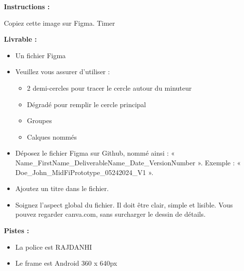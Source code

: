 \makeheaderfiles

\textbf{Instructions :}

Copiez cette image sur Figma.
Timer

\textbf{Livrable :}

\begin{itemize}
\item Un fichier Figma
\item Veuillez vous assurer d'utiliser :
\begin{itemize}
\item 2 demi-cercles pour tracer le cercle autour du minuteur
\item Dégradé pour remplir le cercle principal
\item Groupes
\item Calques nommés
\end{itemize}
\item Déposez le fichier Figma sur Github, nommé ainsi : « Name\_FirstName\_DeliverableName\_Date\_VersionNumber ». Exemple : « Doe\_John\_MidFiPrototype\_05242024\_V1 ».
\item Ajoutez un titre dans le fichier.
\item Soignez l'aspect global du fichier. Il doit être clair, simple et lisible. Vous pouvez regarder canva.com, sans surcharger le dessin de détails.
\end{itemize}

\textbf{Pistes :}

\begin{itemize}
\item La police est RAJDANHI
\item Le frame est Android 360 x 640px
\end{itemize}

